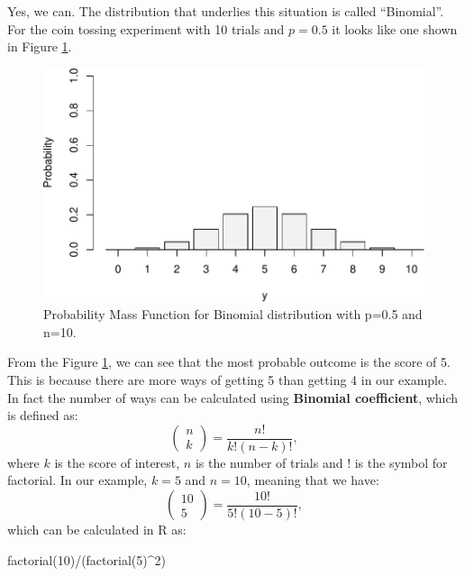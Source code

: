 \documentclass[
]{book}
\newenvironment{Shaded}{\begin{snugshade}}{\end{snugshade}}
\newcommand{\DecValTok}[1]{\textcolor[rgb]{0.00,0.00,0.81}{#1}}
\newcommand{\FunctionTok}[1]{\textcolor[rgb]{0.00,0.00,0.00}{#1}}
\newcommand{\NormalTok}[1]{#1}
\newcommand{\SpecialCharTok}[1]{\textcolor[rgb]{0.00,0.00,0.00}{#1}}
\theoremstyle{definition}
\theoremstyle{definition}
\theoremstyle{definition}
\theoremstyle{definition}
\theoremstyle{remark}
\begin{document}
Yes, we can. The distribution that underlies this situation is called ``Binomial''. For the coin tossing experiment with 10 trials and \(p=0.5\) it looks like one shown in Figure \ref{fig:binomialPMF05}.

\begin{figure}
\centering
\includegraphics{Svetunkov---Statistics-for-Business-Analytics_files/figure-latex/binomialPMF05-1.pdf}
\caption{\label{fig:binomialPMF05}Probability Mass Function for Binomial distribution with p=0.5 and n=10.}
\end{figure}

From the Figure \ref{fig:binomialPMF05}, we can see that the most probable outcome is the score of 5. This is because there are more ways of getting 5 than getting 4 in our example. In fact the number of ways can be calculated using \textbf{Binomial coefficient}, which is defined as:
\begin{equation}
    \begin{pmatrix} n \\ k \end{pmatrix} = \frac{n!}{k!(n-k)!},
    \label{eq:BinomialCoefficient}
\end{equation}
where \(k\) is the score of interest, \(n\) is the number of trials and \(!\) is the symbol for factorial. In our example, \(k=5\) and \(n=10\), meaning that we have:
\begin{equation*}
    \begin{pmatrix} 10 \\ 5 \end{pmatrix} = \frac{10!}{5!(10-5)!} ,
\end{equation*}
which can be calculated in R as:

\begin{Shaded}
\begin{Highlighting}[]
\FunctionTok{factorial}\NormalTok{(}\DecValTok{10}\NormalTok{)}\SpecialCharTok{/}\NormalTok{(}\FunctionTok{factorial}\NormalTok{(}\DecValTok{5}\NormalTok{)}\SpecialCharTok{\^{}}\DecValTok{2}\NormalTok{)}
\end{Highlighting}
\end{Shaded}
\end{document}
